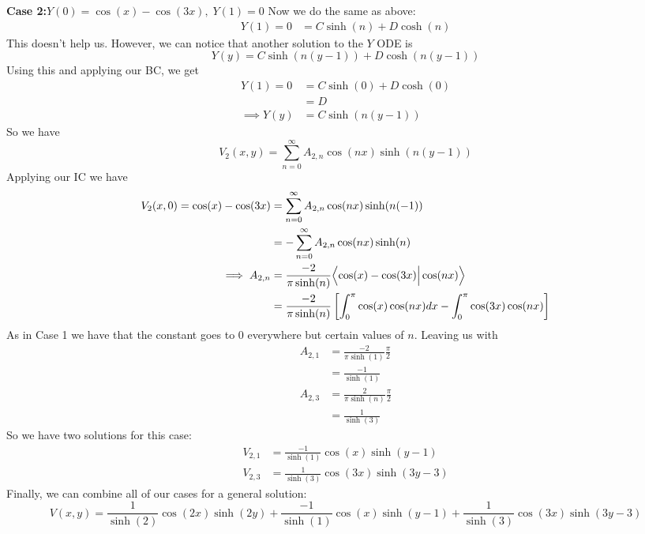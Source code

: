 \documentclass[12pt]{article}
\begin{document}
\begin{enumerate}
\begin{equation*}
        \end{equation*}
        \newline
        \textbf{Case 2:}$Y(0)=\cos(x)-\cos(3x),\;Y(1)=0$ Now we do the same as above:
        \begin{align*}
            Y(1)=0&=C\sinh(n)+D\cosh(n)
        \end{align*}
        This doesn't help us. However, we can notice that another solution to the $Y$ ODE is 
        \begin{equation*}
            Y(y)=C\sinh(n(y-1))+D\cosh(n(y-1))
        \end{equation*}
        Using this and applying our BC, we get 
        \begin{align*}
            Y(1)=0&=C\sinh(0)+D\cosh(0)\\
            &=D\\
            \implies Y(y)&=C\sinh(n(y-1))
        \end{align*}
        So we have 
        \begin{equation*}
            V_2(x,y)=\sum_{n=0}^\infty A_{2,n}\cos(nx)\sinh(n(y-1))
        \end{equation*}
        Applying our IC we have 
        \begin{align*}
            V_2(x,0)=\cos(x)-\cos(3x)&=\sum_{n=0}^\infty A_{2,n}\cos(nx)\sinh(n(-1))\\
            &=-\sum_{n=0}^\infty A_{2,n}\cos(nx)\sinh(n)\\
            \implies A_{2,n}&=\frac{-2}{\pi\sinh(n)} \Bigl< \cos(x)-\cos(3x) \Big| \cos(nx) \Bigr>\\
            &=\frac{-2}{\pi\sinh(n)} \left[ \int_0^\pi \cos(x)\cos(nx) dx - \int_0^\pi \cos(3x)\cos(nx) \right]
        \end{align*}
        As in Case 1 we have that the constant goes to 0 everywhere but certain values of $n$. Leaving us with 
        \begin{align*}
            A_{2,1}&=\frac{-2}{\pi\sinh(1)} \frac{\pi}{2}\\
            &= \frac{-1}{\sinh(1)}\\
            A_{2,3}&=\frac{2}{\pi\sinh(n)} \frac{\pi}{2}\\
            &= \frac{1}{\sinh(3)}
        \end{align*}
        So we have two solutions for this case:
        \begin{align*}
            V_{2,1}&=\frac{-1}{\sinh(1)}\cos(x)\sinh(y-1)\\
            V_{2,3}&=\frac{1}{\sinh(3)}\cos(3x)\sinh(3y-3)
        \end{align*}
        \newline
        \newline
        Finally, we can combine all of our cases for a general solution:
        \begin{equation*}
            V(x,y)=\frac{1}{\sinh(2)}\cos(2x)\sinh(2y)+\frac{-1}{\sinh(1)}\cos(x)\sinh(y-1)+\frac{1}{\sinh(3)}\cos(3x)\sinh(3y-3)
        \end{equation*}
    \end{enumerate}
\end{document}
